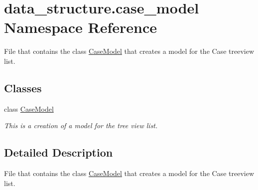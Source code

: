 \hypertarget{a00052}{}\section{data\+\_\+structure.\+case\+\_\+model Namespace Reference}
\label{a00052}


File that contains the class \hyperlink{a00082}{Case\+Model} that creates a model for the Case treeview list.  


\subsection*{Classes}
\begin{DoxyCompactItemize}
\item 
class \hyperlink{a00082}{Case\+Model}
\begin{DoxyCompactList}\small\item\em This is a creation of a model for the tree view list. \end{DoxyCompactList}\end{DoxyCompactItemize}


\subsection{Detailed Description}
File that contains the class \hyperlink{a00082}{Case\+Model} that creates a model for the Case treeview list. 